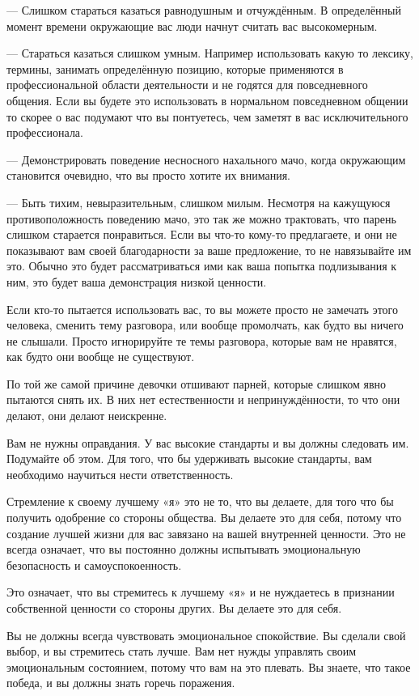 --- Слишком стараться казаться равнодушным и отчуждённым. В определённый момент времени окружающие вас люди начнут считать вас высокомерным.

--- Стараться казаться слишком умным. Например использовать какую то лексику, термины, занимать определённую позицию, которые применяются в профессиональной области деятельности и не годятся для повседневного общения. Если вы будете это использовать в нормальном повседневном общении то скорее о вас подумают что вы понтуетесь, чем заметят в вас исключительного профессионала.

--- Демонстрировать поведение несносного нахального мачо, когда окружающим становится очевидно, что вы просто хотите их внимания.

--- Быть тихим, невыразительным, слишком милым. Несмотря на кажущуюся противоположность поведению мачо, это так же можно трактовать, что парень слишком старается понравиться. Если вы что-то кому-то предлагаете, и они не показывают вам своей благодарности за ваше предложение, то не навязывайте им это. Обычно это будет рассматриваться ими как ваша попытка подлизывания к ним, это будет ваша демонстрация низкой ценности.

Если кто-то пытается использовать вас, то вы можете просто не замечать этого человека, сменить тему разговора, или вообще промолчать, как будто вы ничего не слышали. Просто игнорируйте те темы разговора, которые вам не нравятся, как будто они вообще не существуют.

По той же самой причине девочки отшивают парней, которые слишком явно пытаются снять их. В них нет естественности и непринуждённости, то что они делают, они делают неискренне.

Вам не нужны оправдания. У вас высокие стандарты и вы должны следовать им. Подумайте об этом. Для того, что бы удерживать высокие стандарты, вам необходимо научиться нести ответственность.

Стремление к своему лучшему «я» это не то, что вы делаете, для того что бы получить одобрение со стороны общества. Вы делаете это для себя, потому что создание лучшей жизни для вас завязано на вашей внутренней ценности. Это не всегда означает, что вы постоянно должны испытывать эмоциональную безопасность и самоуспокоенность.

Это означает, что вы стремитесь к лучшему «я» и не нуждаетесь в признании собственной ценности со стороны других. Вы делаете это для себя.

Вы не должны всегда чувствовать эмоциональное спокойствие. Вы сделали свой выбор, и вы стремитесь стать лучше. Вам нет нужды управлять своим эмоциональным состоянием, потому что вам на это плевать. Вы знаете, что такое победа, и вы должны знать горечь поражения.

